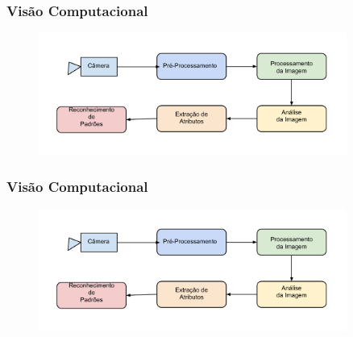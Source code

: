\documentclass{beamer}
\begin{document}

\begin{frame}
\frametitle{Visão Computacional}

	\begin{figure}[!h]
		\begin{center}
			\includegraphics[width=0.9\textwidth]{Figures/ProcessosVC}
		\end{center}
		
	\end{figure}
	
\end{frame}



\begin{frame}
\frametitle{Visão Computacional}

	\begin{figure}[!h]
		\begin{center}
			\includegraphics[width=0.9\textwidth]{Figures/ProcessosVC}
		\end{center}
		
	\end{figure}
	
\end{frame}


\end{document}
